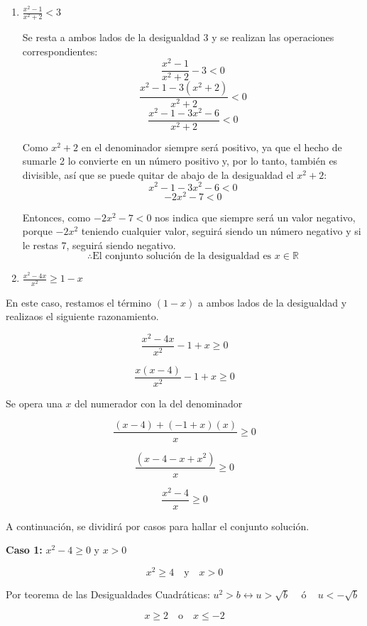 \documentclass{article}
\begin{document}
\begin{enumerate}
\[
x \in \left( \frac{-1 - \sqrt{17}}{4}, 0\right) \cup \left[\frac{-1 + \sqrt{17}}{4}, 1\right)
\]
(Donde \(x \neq 1\) y \(x \neq 0\))\\

  \item \(\frac{x^2-1}{x^2+2}<3\)

Se resta a ambos lados de la desigualdad \(3\) y se realizan las operaciones correspondientes:
\[
\frac{x^2-1}{x^2+2} - 3 < 0
\]
\[
\frac{x^2-1-3(x^2+2)}{x^2+2} < 0
\]
\[
\frac{x^2-1-3x^2-6}{x^2+2} < 0
\]

Como \(x^2+2\) en el denominador siempre será positivo, ya que el hecho de sumarle 2 lo convierte en un número positivo y, por lo tanto, también es divisible, así que se puede quitar de abajo de la desigualdad el \(x^2+2\):
\[
x^2-1-3x^2-6 < 0
\]
\[
-2x^2-7 < 0
\]

Entonces, como \(-2x^2-7 < 0\) nos indica que siempre será un valor negativo, porque \(-2x^2\) teniendo cualquier valor, seguirá siendo un número negativo y si le restas 7, seguirá siendo negativo.
\[
\therefore \text{El conjunto solución de la desigualdad es } x \in \mathbb{R}
\]


  
  \item \(\frac{x^2-4x}{x^2}\geq 1-x\)
\end{enumerate}

En este caso, restamos el término \((1-x)\) a ambos lados de la desigualdad y realizaos el siguiente razonamiento.

\[
\frac{{x^2-4x}}{{x^2}} - 1 + x \geq 0
\]

\[
\frac{{x(x-4)}}{{x^2}} - 1 + x \geq 0
\]

Se opera una \(x\) del numerador con la del denominador

\[
\frac{{(x-4) + (-1+x)(x)}}{{x}} \geq 0
\]

\[
\frac{{(x-4-x+x^2)}}{{x}} \geq 0
\]

\[
\frac{{x^2-4}}{{x}} \geq 0
\]

A continuación, se dividirá por casos para hallar el conjunto solución.

\textbf{Caso 1:} \(x^2-4 \geq 0\) y \(x > 0\)

\[
x^2 \geq 4 \quad \text{y} \quad x > 0
\]

Por teorema de las Desigualdades Cuadráticas: \(u^2 > b \leftrightarrow u > \sqrt{b} \, \quad \text{ó} \, \quad u < -\sqrt{b}\)

\[
x \geq 2 \quad \text{o} \quad x \leq -2
\]
\end{document}
